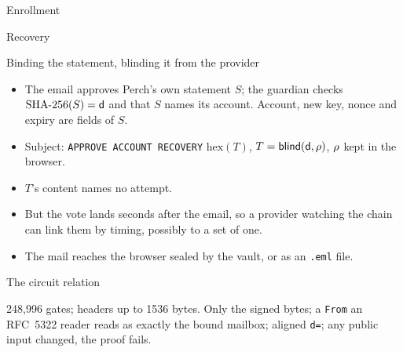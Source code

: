 \documentclass[aspectratio=169,11pt]{beamer}
\begin{document}
\begin{frame}{Enrollment}
  \centering
  
\end{frame}

\begin{frame}{Recovery}
  \centering
  
\end{frame}

\begin{frame}{Binding the statement, blinding it from the provider}
  \small
  \begin{itemize}
    \item The email approves Perch's own statement $S$; the guardian checks
      $\mathrm{SHA\text{-}256}(S) = \mathsf{d}$ and that $S$ names its account. Account, new key,
      nonce and expiry are fields of $S$.
    \item Subject: \texttt{APPROVE \OpNameUpper{} ACCOUNT RECOVERY}
      $\mathrm{hex}(T)$, $T = \mathsf{blind}(\mathsf{d}, \rho)$, $\rho$ kept in the
      browser.
    \item $T$'s content names no attempt.
    \item But the vote lands seconds after the email, so a provider watching
      the chain can link them by timing, possibly to a set of
      one.
    \item The mail reaches the browser sealed by the vault, or as an
      \texttt{.eml} file.
  \end{itemize}
\end{frame}

\begin{frame}{The circuit relation}
  \centering
  \resizebox{!}{0.78\textheight}{}
  \par\smallskip\footnotesize
  248{,}996 gates; headers up to 1536 bytes.
  Only the signed bytes; a \texttt{From} an RFC~5322 reader reads as exactly
  the bound mailbox; aligned \texttt{d=}; any public input changed, the proof
  fails.
\end{frame}
\end{document}
